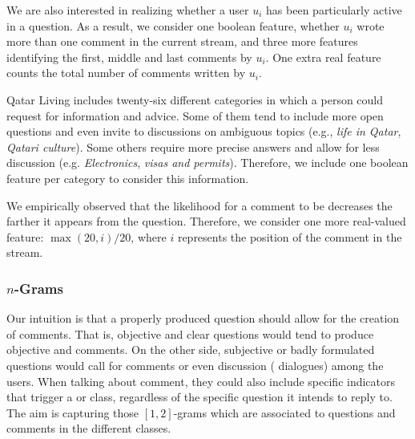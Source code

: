 We are also interested in realizing whether a user $u_i$ has been particularly 
active in a question. As a result, we consider one boolean feature, whether 
$u_i$ wrote more than one comment in the current stream, and three more features 
identifying the first, middle and last comments by $u_i$. One extra real feature 
counts the total number of comments written by $u_i$.

Qatar Living includes twenty-six different categories in which a person could 
request for information and advice. Some of them tend to include more open 
questions and even invite to discussions on ambiguous topics (e.g., \textit{life 
in Qatar}, \textit{Qatari culture}). Some others require more precise answers 
and allow for less discussion (e.g. \textit{Electronics}, \textit{visas and 
permits}). Therefore, we include one boolean feature per category to consider 
this information. 
 
We empirically observed that the likelihood for a comment to be \good decreases 
the farther it appears from the question. Therefore, we consider one more 
real-valued feature: $\max(20, i)/20$, where $i$ represents the position of 
the comment in the stream.
 



\subsubsection{$n$-Grams }
\label{ssub:ngrams}

Our intuition is that a properly produced question should allow for the 
creation of \good comments. That is, objective and clear questions would tend to 
produce objective and \good comments. On the other side, subjective or badly 
formulated questions would call for \bad comments or even discussion (\ie 
dialogues) among the users. When talking about comment, they could also include 
specific indicators that trigger a \good or \bad class, regardless of the 
specific question it intends to reply to. The aim is capturing those 
$[1,2]$-grams which are associated to questions and comments in the different 
classes.

